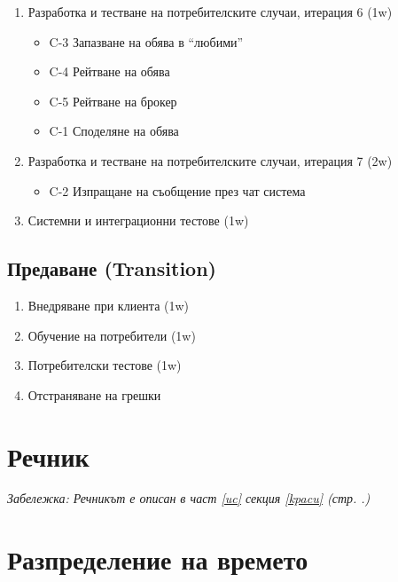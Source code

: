 \documentclass[a4paper]{article}
\begin{document}
\begin{enumerate}
{}		
\item {Разработка и тестване на потребителските случаи, итерация 6 (1w)
	\begin{itemize}
		\item C-3	Запазване на обява в ``любими''
		\item C-4	Рейтване на обява
		\item C-5	Рейтване на брокер
		\item C-1	Споделяне на обява
	\end{itemize}		
}		
\item {Разработка и тестване на потребителските случаи, итерация 7 (2w)
	\begin{itemize}
		\item C-2	Изпращане на съобщение през чат система
	\end{itemize}		
}		

\item Системни и интеграционни тестове (1w)
\end{enumerate}

\subsection{Предаване (Transition)} %
\begin{enumerate}
	\item Внедряване при клиента (1w)
	\item Обучение на потребители (1w)
	\item Потребителски тестове (1w)
	\item Отстраняване на грешки
\end{enumerate}

\clearpage
\section{Речник}

\emph{Забележка: Речникът е описан в част \ref{uc} секция \ref{kpacu} (стр. \pageref{kpacu}.)} 

\section{Разпределение на времето} %

\setcounter{table}{0}
\end{document}
